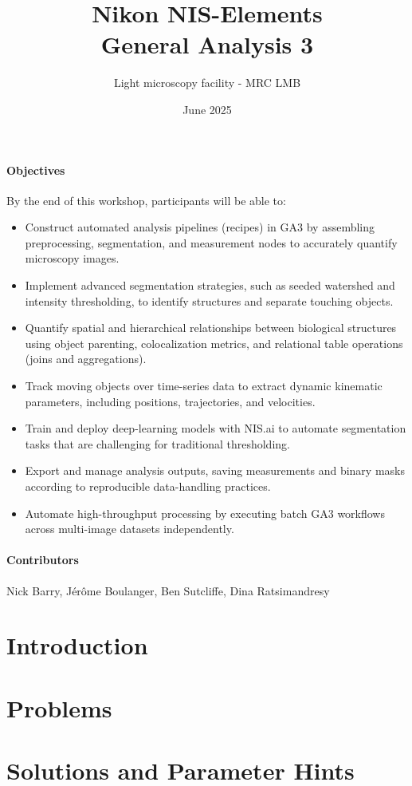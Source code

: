 \documentclass[a4paper,dvipsnames,headsepline,8pt,twocolumn]{scrartcl}
\title{Nikon NIS-Elements\\ General Analysis 3}
\author{Light microscopy facility - MRC LMB}
\date{June 2025}
\begin{document}
\maketitle

\paragraph{Objectives}
By the end of this workshop, participants will be able to:
\begin{itemize}
  \item Construct automated analysis pipelines (recipes) in GA3 by assembling preprocessing, segmentation, and measurement nodes to accurately quantify microscopy images.
  \item  Implement advanced segmentation strategies, such as seeded watershed and intensity thresholding, to identify structures and separate touching objects.
  \item  Quantify spatial and hierarchical relationships between biological structures using object parenting, colocalization metrics, and relational table operations (joins and aggregations).
  \item  Track moving objects over time-series data to extract dynamic kinematic parameters, including positions, trajectories, and velocities.
  \item  Train and deploy deep-learning models with NIS.ai to automate segmentation tasks that are challenging for traditional thresholding.
  \item  Export and manage analysis outputs, saving measurements and binary masks according to reproducible data-handling practices.
  \item Automate high-throughput processing by executing batch GA3 workflows across multi-image datasets independently.

\end{itemize}

\paragraph{Contributors}
Nick Barry, Jérôme Boulanger, Ben Sutcliffe, Dina Ratsimandresy

\tableofcontents %
\section{Introduction}

\section{Problems}

\printbibliography

\appendix
\addtolength{\leftskip}{0.5cm}
\section*{Solutions and Parameter Hints}
\printendnotes
\end{document}
